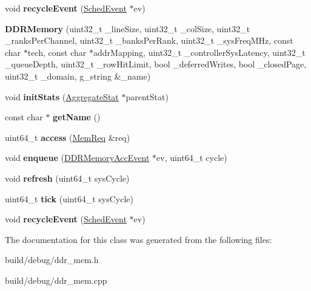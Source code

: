 \begin{DoxyCompactItemize}
\item 
\hypertarget{classDDRMemory_a53c30add30e8bff9a8c8610ef449d86b}{void {\bfseries recycle\-Event} (\hyperlink{classSchedEvent}{Sched\-Event} $\ast$ev)}\label{classDDRMemory_a53c30add30e8bff9a8c8610ef449d86b}

\item 
\hypertarget{classDDRMemory_ac06b4672c35282e8dcb99628fdd33f2d}{{\bfseries D\-D\-R\-Memory} (uint32\-\_\-t \-\_\-line\-Size, uint32\-\_\-t \-\_\-col\-Size, uint32\-\_\-t \-\_\-ranks\-Per\-Channel, uint32\-\_\-t \-\_\-banks\-Per\-Rank, uint32\-\_\-t \-\_\-sys\-Freq\-M\-Hz, const char $\ast$tech, const char $\ast$addr\-Mapping, uint32\-\_\-t \-\_\-controller\-Sys\-Latency, uint32\-\_\-t \-\_\-queue\-Depth, uint32\-\_\-t \-\_\-row\-Hit\-Limit, bool \-\_\-deferred\-Writes, bool \-\_\-closed\-Page, uint32\-\_\-t \-\_\-domain, g\-\_\-string \&\-\_\-name)}\label{classDDRMemory_ac06b4672c35282e8dcb99628fdd33f2d}

\item 
\hypertarget{classDDRMemory_a58c0d5633d6ada4c71d06a452ca716a1}{void {\bfseries init\-Stats} (\hyperlink{classAggregateStat}{Aggregate\-Stat} $\ast$parent\-Stat)}\label{classDDRMemory_a58c0d5633d6ada4c71d06a452ca716a1}

\item 
\hypertarget{classDDRMemory_a0755b4e9f98c10e62c437ae7d7111c0a}{const char $\ast$ {\bfseries get\-Name} ()}\label{classDDRMemory_a0755b4e9f98c10e62c437ae7d7111c0a}

\item 
\hypertarget{classDDRMemory_a1bc441f6c27aa782f6c10ffcc44a74aa}{uint64\-\_\-t {\bfseries access} (\hyperlink{structMemReq}{Mem\-Req} \&req)}\label{classDDRMemory_a1bc441f6c27aa782f6c10ffcc44a74aa}

\item 
\hypertarget{classDDRMemory_a749d93a0a63f591c794c9718da692c8f}{void {\bfseries enqueue} (\hyperlink{classDDRMemoryAccEvent}{D\-D\-R\-Memory\-Acc\-Event} $\ast$ev, uint64\-\_\-t cycle)}\label{classDDRMemory_a749d93a0a63f591c794c9718da692c8f}

\item 
\hypertarget{classDDRMemory_a3f20a7e4a2d31a9220f3da4b39f84768}{void {\bfseries refresh} (uint64\-\_\-t sys\-Cycle)}\label{classDDRMemory_a3f20a7e4a2d31a9220f3da4b39f84768}

\item 
\hypertarget{classDDRMemory_a5ce560abc597aef55fa3f21b28d00d58}{uint64\-\_\-t {\bfseries tick} (uint64\-\_\-t sys\-Cycle)}\label{classDDRMemory_a5ce560abc597aef55fa3f21b28d00d58}

\item 
\hypertarget{classDDRMemory_a53c30add30e8bff9a8c8610ef449d86b}{void {\bfseries recycle\-Event} (\hyperlink{classSchedEvent}{Sched\-Event} $\ast$ev)}\label{classDDRMemory_a53c30add30e8bff9a8c8610ef449d86b}

\end{DoxyCompactItemize}


The documentation for this class was generated from the following files\-:\begin{DoxyCompactItemize}
\item 
build/debug/ddr\-\_\-mem.\-h\item 
build/debug/ddr\-\_\-mem.\-cpp\end{DoxyCompactItemize}
